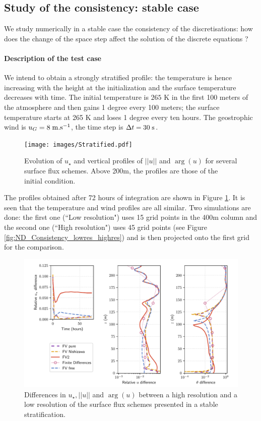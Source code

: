 \subsection{Study of the consistency: stable case}
We study numerically in a stable case the consistency of the
discretisations: how does the change of the space step affect the
solution of the discrete equations ?
\paragraph{Description of the test case}
We intend to obtain a strongly stratified profile: the temperature
is hence increasing with the height at the initialization and
the surface temperature decreases with time.
The initial temperature is $265$ K in the first 100 meters of the
atmosphere and then gains 1 degree every 100 meters;
the surface temperature starts at 265 K and loses
1 degree every ten hours.
The geostrophic wind is $u_G = 8 \;{\rm m}.{\rm s}^{-1}$,
the time step is $\Delta t = 30 \;{\rm s}$.
\begin{figure}
	\centering
\texttt{[image: images/Stratified.pdf]}
	\caption{ Evolution of $u_\star$ and
		vertical profiles of $||u||$ and $\arg(u)$ for
		several surface flux schemes. Above 200m,
		the profiles are those of the initial condition.
	}
	\label{fig:ND_Consistency_Stratified}
\end{figure}
The profiles obtained after 72 hours of integration are
shown in Figure \ref{fig:ND_Consistency_Stratified}.
It is seen that the temperature and wind profiles are
all similar.
Two simulations are done: the first one (``Low resolution")
uses 15 grid points
in the 400m column and the second one (``High resolution")
uses 45 grid points (see Figure \ref{fig:ND_Consistency_lowres_highres})
and is then projected onto the first grid for the comparison.
\begin{figure}
	\centering
\includegraphics[scale=0.6]{images/consistency_comparisonStratified.pdf}
	\caption{Differences in $u_\star, ||u||$ and $\arg(u)$
	between a high resolution and a low resolution
	of the surface flux schemes presented in a stable
	stratification.
	}
	\label{fig:ND_Consistency_comparisonStratified}
\end{figure}
